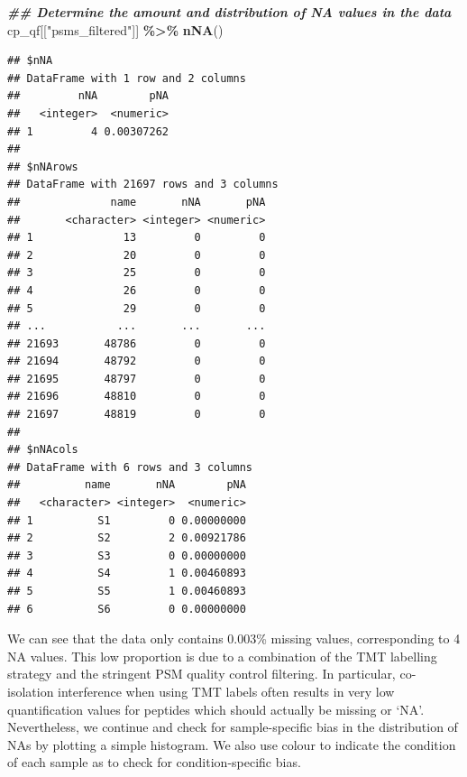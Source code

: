 \documentclass[9pt,a4paper,]{extarticle}
\newenvironment{Shaded}{\begin{snugshade}}{\end{snugshade}}
\newcommand{\DocumentationTok}[1]{\textcolor[rgb]{0.56,0.35,0.01}{\textbf{\textit{#1}}}}
\newcommand{\FunctionTok}[1]{\textcolor[rgb]{0.13,0.29,0.53}{\textbf{#1}}}
\newcommand{\NormalTok}[1]{#1}
\newcommand{\SpecialCharTok}[1]{\textcolor[rgb]{0.81,0.36,0.00}{\textbf{#1}}}
\newcommand{\StringTok}[1]{\textcolor[rgb]{0.31,0.60,0.02}{#1}}
\begin{document}
\begin{Shaded}
\begin{Highlighting}[]
\DocumentationTok{\#\# Determine the amount and distribution of NA values in the data}
\NormalTok{cp\_qf[[}\StringTok{"psms\_filtered"}\NormalTok{]] }\SpecialCharTok{\%\textgreater{}\%}
  \FunctionTok{nNA}\NormalTok{()}
\end{Highlighting}
\end{Shaded}

\begin{verbatim}
## $nNA
## DataFrame with 1 row and 2 columns
##         nNA        pNA
##   <integer>  <numeric>
## 1         4 0.00307262
## 
## $nNArows
## DataFrame with 21697 rows and 3 columns
##              name       nNA       pNA
##       <character> <integer> <numeric>
## 1              13         0         0
## 2              20         0         0
## 3              25         0         0
## 4              26         0         0
## 5              29         0         0
## ...           ...       ...       ...
## 21693       48786         0         0
## 21694       48792         0         0
## 21695       48797         0         0
## 21696       48810         0         0
## 21697       48819         0         0
## 
## $nNAcols
## DataFrame with 6 rows and 3 columns
##          name       nNA        pNA
##   <character> <integer>  <numeric>
## 1          S1         0 0.00000000
## 2          S2         2 0.00921786
## 3          S3         0 0.00000000
## 4          S4         1 0.00460893
## 5          S5         1 0.00460893
## 6          S6         0 0.00000000
\end{verbatim}

We can see that the data only contains 0.003\%
missing values, corresponding to 4 NA
values. This low proportion is due to a combination of the TMT labelling
strategy and the stringent PSM quality control filtering. In particular,
co-isolation interference when using TMT labels often results in very low
quantification values for peptides which should actually be missing or `NA'.
Nevertheless, we continue and check for sample-specific bias in the distribution
of NAs by plotting a simple histogram. We also use colour to indicate the
condition of each sample as to check for condition-specific bias.
\end{document}
